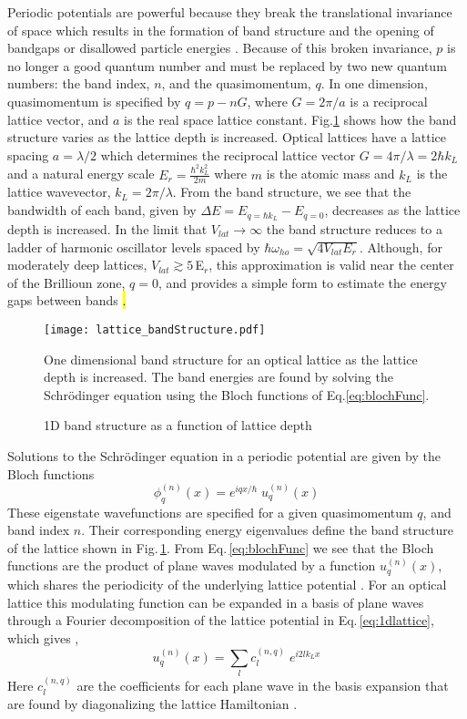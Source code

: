 Periodic potentials are powerful because they break the translational invariance of space which results in the formation of band structure and the opening of bandgaps or disallowed particle energies \cite{Ashcroft1976}.
Because of this broken invariance, $p$ is no longer a good quantum number and must be replaced by two new quantum numbers: the band index, $n$, and the quasimomentum, $q$.
In one dimension, quasimomentum is specified by $q = p - nG$, where $G=2\pi/a$ is a reciprocal lattice vector, and $a$ is the real space lattice constant.
Fig.\;\ref{fig:bandStructure} shows how the band structure varies as the lattice depth is increased.
Optical lattices have a lattice spacing $a = \lambda /2$ which determines the reciprocal lattice vector $G = 4\pi / \lambda = 2 \hbar k_L$ and a natural energy scale $E_r = \frac{\hbar^2 k_L^2}{2m}$ where $m$ is the atomic mass and $k_L$ is the lattice wavevector, $k_L = 2\pi / \lambda$.
From the band structure, we see that the bandwidth of each band, given by $\Delta E = E_{q=\hbar k_L} - E_{q=0}$, decreases as the lattice depth is increased.
In the limit that $V_{lat}\!\rightarrow\!\infty$ the band structure reduces to a ladder of harmonic oscillator levels spaced by $\hbar \omega_{ho} = \sqrt{4 V_{lat} E_r}$.
Although, for moderately deep lattices, $V_{lat} \gtrsim 5\,$E$_r$, this approximation is valid near the center of the Brillioun zone, $q = 0$, and provides a simple form to estimate the energy gaps between bands \hl{\cite{Jaksch1998,Jaksch2005}.}
	\begin{figure} \label{fig:bandStructure}
		\centerline{
		\texttt{[image: lattice\_bandStructure.pdf]}}
		\caption{1D band structure as a function of lattice depth}{One dimensional band structure for an optical lattice as the lattice depth is increased. The band energies are found by solving the Schr\"{o}dinger equation using the Bloch functions of Eq.\;\ref{eq:blochFunc}.}
	\end{figure}

Solutions to the Schr\"{o}dinger equation in a periodic potential are given by the Bloch functions \cite{Ashcroft1976}
	\begin{equation} \label{eq:blochFunc}
		 \phi_q^{(n)}(x) = e^{iqx/ \hbar} \; u_q^{(n)}(x)
	\end{equation}
These eigenstate wavefunctions are specified for a given quasimomentum $q$, and band index $n$. 
Their corresponding energy eigenvalues define the band structure of the lattice shown in Fig.\,\ref{fig:bandStructure}.
From Eq.\,\ref{eq:blochFunc} we see that the Bloch functions are the product of plane waves modulated by a function $u_q^{(n)}(x)$, which shares the periodicity of the underlying lattice potential \cite{Ashcroft1976}.
For an optical lattice this modulating function can be expanded in a basis of plane waves through a Fourier decomposition of the lattice potential in Eq.\,\ref{eq:1dlattice}, which gives \cite{Greiner2003},
	\begin{equation} \label{eq:blochMod}
		 u_q^{(n)}(x) = \sum_l c_l^{(n,q)} \; e^{i2lk_Lx}
	\end{equation}
Here $c_l^{(n,q)}$ are the coefficients for each plane wave in the basis expansion that are found by diagonalizing the lattice Hamiltonian \cite{Greiner2003}.

